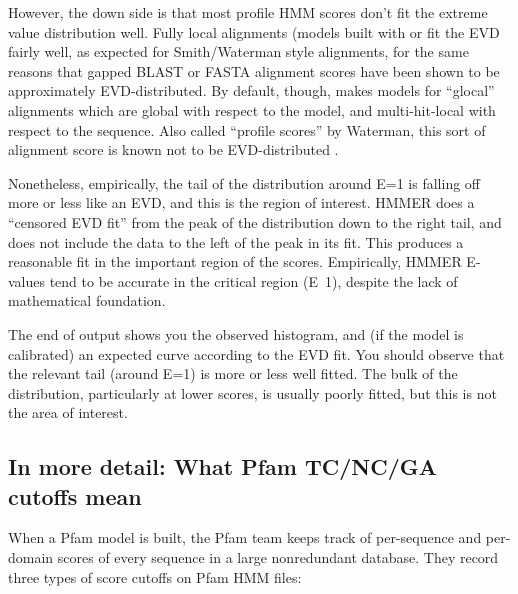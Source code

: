 However, the down side is that most profile HMM scores don't fit the
extreme value distribution well. Fully local alignments (models built
with  or  fit the EVD fairly well,
as expected for Smith/Waterman style alignments, for the same reasons
that gapped BLAST or FASTA alignment scores have been shown to be
approximately EVD-distributed. By default, though, 
makes models for ``glocal'' alignments which are global with respect
to the model, and multi-hit-local with respect to the sequence.  Also
called ``profile scores'' by Waterman, this sort of alignment score is
known not to be EVD-distributed \cite{GoldsteinWaterman94}.

Nonetheless, empirically, the tail of the distribution around E=1 is
falling off more or less like an EVD, and this is the region of
interest. HMMER does a ``censored EVD fit'' from the peak of the
distribution down to the right tail, and does not include the data to
the left of the peak in its fit. This produces a reasonable fit in the
important region of the scores. Empirically, HMMER E-values tend to be
accurate in the critical region (E~1), despite the lack of
mathematical foundation.

The end of  output shows you the observed histogram,
and (if the model is calibrated) an expected curve according to the
EVD fit. You should observe that the relevant tail (around E=1) is
more or less well fitted. The bulk of the distribution, particularly
at lower scores, is usually poorly fitted, but this is not the area of
interest.

\subsection{In more detail: What Pfam TC/NC/GA cutoffs mean}

When a Pfam model is built, the Pfam team keeps track of per-sequence
and per-domain scores of every sequence in a large nonredundant
database. They record three types of score cutoffs on Pfam HMM files:


